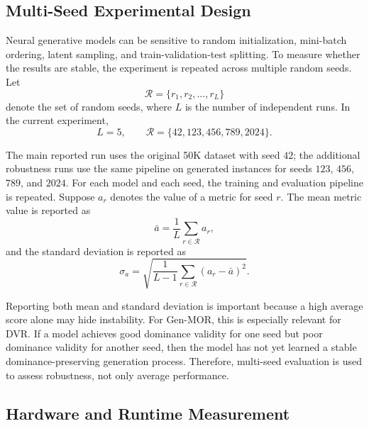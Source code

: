 \subsection{Multi-Seed Experimental Design}
\label{subsec:multi_seed_design}

Neural generative models can be sensitive to random initialization, mini-batch ordering, latent sampling, and train-validation-test splitting. To measure whether the results are stable, the experiment is repeated across multiple random seeds. Let
\begin{equation}
    \mathcal{R} = \{r_1, r_2, \ldots, r_L\}
    \label{eq:random_seed_set}
\end{equation}
denote the set of random seeds, where $L$ is the number of independent runs. In the current experiment,
\begin{equation}
    L = 5,
    \qquad
    \mathcal{R} = \{42,123,456,789,2024\}.
    \label{eq:seed_count_and_list}
\end{equation}

The main reported run uses the original 50K dataset with seed $42$; the additional robustness runs use the same pipeline on generated instances for seeds $123$, $456$, $789$, and $2024$. For each model and each seed, the training and evaluation pipeline is repeated. Suppose $a_r$ denotes the value of a metric for seed $r$. The mean metric value is reported as
\begin{equation}
    \bar{a}
    =
    \frac{1}{L}
    \sum_{r \in \mathcal{R}} a_r,
    \label{eq:metric_mean}
\end{equation}
and the standard deviation is reported as
\begin{equation}
    \sigma_a
    =
    \sqrt{
        \frac{1}{L-1}
        \sum_{r \in \mathcal{R}}
        (a_r-\bar{a})^2
    }.
    \label{eq:metric_std}
\end{equation}

Reporting both mean and standard deviation is important because a high average score alone may hide instability. For Gen-MOR, this is especially relevant for DVR. If a model achieves good dominance validity for one seed but poor dominance validity for another seed, then the model has not yet learned a stable dominance-preserving generation process. Therefore, multi-seed evaluation is used to assess robustness, not only average performance.

\subsection{Hardware and Runtime Measurement}
\label{subsec:hardware_runtime}

